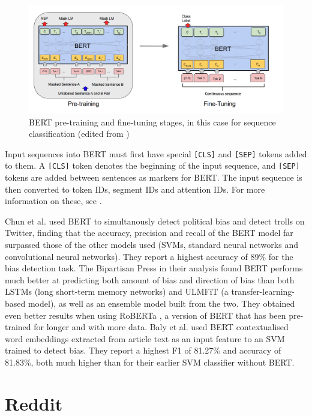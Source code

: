 \begin{figure}
    \centering
    \includegraphics[scale=0.37]{0-img/bert-pretraining-finetuning.png}
    \caption{BERT pre-training and fine-tuning stages, in this case for sequence classification (edited from \cite{bert})}
    \label{fig:bert-pretraining-finetuning}
\end{figure}

Input sequences into BERT must first have special \texttt{[CLS]} and \texttt{[SEP]} tokens added to them. A \texttt{[CLS]} token denotes the beginning of the input sequence, and \texttt{[SEP]} tokens are added between sentences as markers for BERT. The input sequence is then converted to token IDs, segment IDs and attention IDs. For more information on these, see \cite{bert}.

Chun et al. \cite{chun} used BERT to simultanously detect political bias and detect trolls on Twitter, finding that the accuracy, precision and recall of the BERT model far surpassed those of the other models used (SVMs, standard neural networks and convolutional neural networks). They report a highest accuracy of 89\% for the bias detection task. The Bipartisan Press in their analysis \cite{bipartisan-press} found BERT performs much better at predicting both amount of bias and direction of bias than both LSTMs (long short-term memory networks) and ULMFiT (a transfer-learning-based model), as well as an ensemble model built from the two. They obtained even better results when using RoBERTa \cite{roberta}, a version of BERT that has been pre-trained for longer and with more data. Baly et al. \cite{baly-acl2020} used BERT contextualised word embeddings extracted from article text as an input feature to an SVM trained to detect bias. They report a highest F1 of 81.27\% and accuracy of 81.83\%, both much higher than for their earlier SVM classifier without BERT.

\section{Reddit} \label{sec:reddit}

